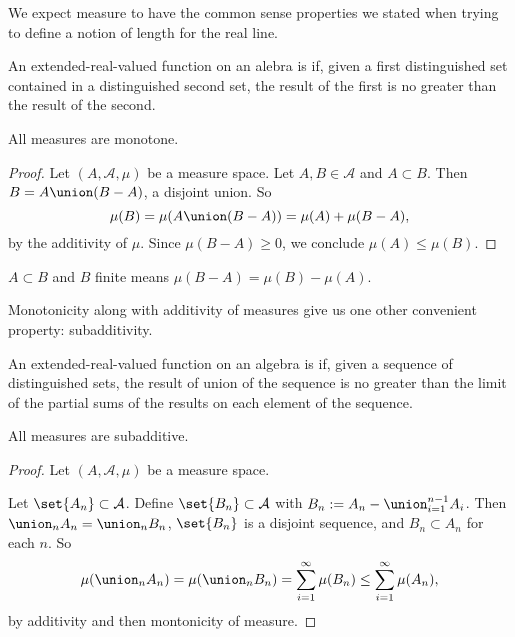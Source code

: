 

We expect measure to have the
common sense properties we stated
when trying to define a notion of
length for the real line.


An extended-real-valued function on an
alebra is
if, given a first distinguished set contained in
a distinguished second set, the result of the
first is no greater than the result of the second.

\begin{prop}
  All measures are monotone.
  \begin{proof}
    Let $(A, \mathcal{A}, \mu)$ be
    a measure space.
    Let $A, B \in \mathcal{A}$
    and $A \subset B$.
    Then $B = A \union (B - A)$,
    a disjoint union.
    So
    \[
      \mu(B) = \mu(A \union (B - A))= \mu(A) + \mu(B - A),
    \]
    by the additivity of $\mu$.
    Since $\mu(B - A) \geq 0$,
    we conclude $\mu(A) \leq \mu(B)$.
  \end{proof}
\end{prop}

\begin{prop}
  $A \subset B$ and $B$ finite
  means $\mu(B - A) = \mu(B) - \mu(A)$.
\end{prop}



Monotonicity along with additivity of
measures give us one other convenient
property: subadditivity.

An extended-real-valued function on an algebra is
if, given a sequence of distinguished sets, the
result of union of the sequence is no greater than
the limit of the partial sums of the results on
each element of the sequence.

\begin{prop}
  All measures are subadditive.
  \begin{proof}
    Let $(A, \mathcal{A}, \mu)$ be a measure space.

    Let $\set{A_n} \subset \mathcal{A}$.
    Define $\set{B_n} \subset \mathcal{A}$
    with $B_n := A_n - \union_{i = 1}^{n-1} A_i$.
    Then
    $\union_n A_n = \union_n B_n$,
    $\set{B_n}$ is a disjoint sequence, and
    $B_n \subset A_n$ for each $n$.
    So
    \[
      \mu(\union_{n} A_n) = \mu(\union_{n} B_n) = \sum_{i = 1}^{\infty} \mu(B_n) \leq \sum_{i = 1}^{\infty} \mu(A_n),
    \]
    by additivity and then montonicity of measure.
  \end{proof}

\end{prop}

